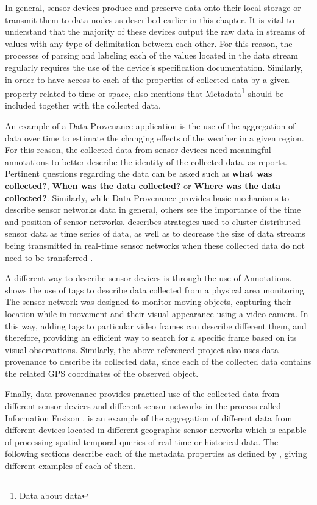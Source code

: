 In general, sensor devices produce and preserve data onto their local
storage or transmit them to data nodes as described earlier in this chapter. It
is vital to understand that the majority of these devices output the raw data
in streams of values with any type of delimitation between each other. For
this reason, the processes of parsing and labeling each of the values located
in the data stream regularly requires the use of the device's specification
documentation. Similarly, in order to have access to each of the properties of
collected data by a given property related to time or space,
\cite{sn-provenance} also mentions that Metadata\footnote{Data about data}
should be included together with the collected data.

An example of a Data Provenance application is the use of the aggregation of data
over time to estimate the changing effects of the weather in a given region.
For this reason, the collected data from sensor devices need meaningful
annotations to better describe the identity of the collected data, as 
\cite{sn-provenance} reports. Pertinent questions regarding the
data can be asked such as \textbf{what was collected?}, \textbf{When was the
data collected?} or \textbf{Where was the data collected?}. Similarly, while
Data Provenance provides basic mechanisms to describe sensor networks data in
general, others see the importance of the time and position of sensor networks.
\cite{sn-time-series} describes strategies used to cluster distributed sensor
data as time series of data, as well as to decrease the size of data streams
being transmitted in real-time sensor networks when these collected data do
not need to be transferred \cite{sn-data-reduction}.

A different way to describe sensor devices is through the use of
Annotations. \cite{sn-annotation} shows the use of tags to describe data
collected from a physical area monitoring. The sensor network was
designed to monitor moving objects, capturing their location while in
movement and their visual appearance using a video camera. In this way,
adding tags to particular video frames can describe different them, and
therefore, providing an efficient way to search for a specific frame based on
its visual observations. Similarly, the above referenced project also uses data
provenance to describe its collected data, since each of the collected data 
contains the related GPS coordinates of the observed object.

Finally, data provenance provides practical use of the collected data from
different sensor devices and different sensor networks in the process called
Information Fusison \cite{sn-info-fusion}. \cite{sn-geo-metadata} is an example of
the aggregation of different data from different devices located in different 
geographic sensor networks which is capable of processing spatial-temporal 
queries of real-time or historical data. The following sections describe each 
of the metadata properties as defined by \cite{sn-provenance}, giving different
examples of each of them.

